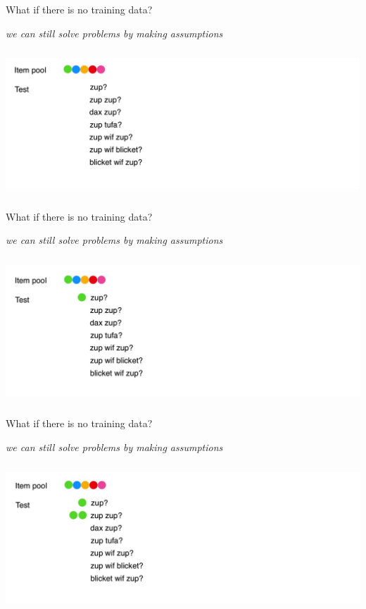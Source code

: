 \documentclass[aspectratio=169,t,handout,xcolor={usenames,dvipsnames}]{beamer}
\begin{document}
\begin{frame}{What if there is no training data?}
\centerline{\textit{we can still solve problems by making assumptions}}
\centering\includegraphics[height=5.5cm]{image/Jietu20220328-191412.jpg}

\end{frame}

\begin{frame}{What if there is no training data?}
\centerline{\textit{we can still solve problems by making assumptions}}
\centering\includegraphics[height=5.5cm]{image/Jietu20220328-191823.jpg}

\end{frame}

\begin{frame}{What if there is no training data?}
\centerline{\textit{we can still solve problems by making assumptions}}
\centering\includegraphics[height=5.5cm]{image/Jietu20220328-191448.jpg}

\end{frame}
\end{document}
